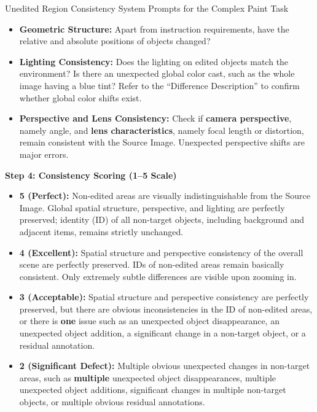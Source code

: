 \begin{promptbox}[label={System Prompts: URC_Complex_paint}]{Unedited Region Consistency System Prompts for the Complex Paint Task}
\begin{itemize}[leftmargin=2.2em, labelsep=0.5em, itemsep=2pt]
    \begin{itemize}[leftmargin=2.2em, labelsep=0.5em, itemsep=2pt]
        \item \textbf{Geometric Structure:} Apart from instruction requirements, have the relative and absolute positions of objects changed?
        
        \item \textbf{Lighting Consistency:} Does the lighting on edited objects match the environment? Is there an unexpected global color cast, such as the whole image having a blue tint? Refer to the ``Difference Description'' to confirm whether global color shifts exist.
        
        \item \textbf{Perspective and Lens Consistency:} Check if \textbf{camera perspective}, namely angle, and \textbf{lens characteristics}, namely focal length or distortion, remain consistent with the Source Image. Unexpected perspective shifts are major errors.
    \end{itemize}
\end{itemize}

\medskip

\textbf{Step 4: Consistency Scoring (1--5 Scale)}

\begin{itemize}[leftmargin=2.2em, labelsep=0.5em, itemsep=2pt]
    \item \textbf{5 (Perfect):} Non-edited areas are visually indistinguishable from the Source Image. Global spatial structure, perspective, and lighting are perfectly preserved; identity (ID) of all non-target objects, including background and adjacent items, remains strictly unchanged.
    
    \item \textbf{4 (Excellent):} Spatial structure and perspective consistency of the overall scene are perfectly preserved. IDs of non-edited areas remain basically consistent. Only extremely subtle differences are visible upon zooming in.
    
    \item \textbf{3 (Acceptable):} Spatial structure and perspective consistency are perfectly preserved, but there are obvious inconsistencies in the ID of non-edited areas, or there is \textbf{one} issue such as an unexpected object disappearance, an unexpected object addition, a significant change in a non-target object, or a residual annotation.
    
    \item \textbf{2 (Significant Defect):} Multiple obvious unexpected changes in non-target areas, such as \textbf{multiple} unexpected object disappearances, multiple unexpected object additions, significant changes in multiple non-target objects, or multiple obvious residual annotations.
    

\end{itemize}
\end{promptbox}

